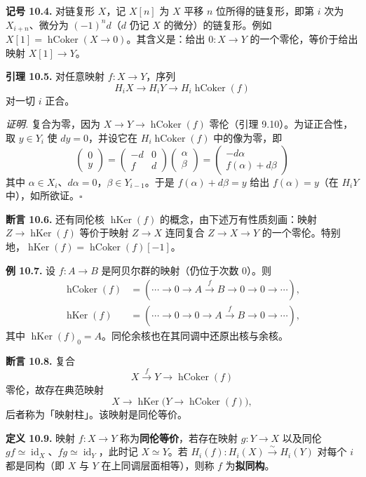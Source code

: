 \textbf{记号 10.4.} 对链复形 $X$，记 $X[n]$ 为 $X$ 平移 $n$ 位所得的链复形，即第 $i$ 次为 $X_{i+n}$、微分为 $(-1)^nd$（$d$ 仍记 $X$ 的微分）的链复形。例如 $X[1]=\operatorname{hCoker}(X\to0)$。其含义是：给出 $0\colon X\to Y$ 的一个零伦，等价于给出映射 $X[1]\to Y$。

\textbf{引理 10.5.} 对任意映射 $f\colon X\to Y$，序列
\[
H_iX\to H_iY\to H_i\operatorname{hCoker}(f)
\]
对一切 $i$ 正合。

\textit{证明.} 复合为零，因为 $X\to Y\to\operatorname{hCoker}(f)$ 零伦（引理 9.10）。为证正合性，取 $y\in Y_i$ 使 $dy=0$，并设它在 $H_i\operatorname{hCoker}(f)$ 中的像为零，即
\[
\begin{pmatrix}0\\ y\end{pmatrix}
=\begin{pmatrix}-d&0\\ f&d\end{pmatrix}\begin{pmatrix}\alpha\\ \beta\end{pmatrix}
=\begin{pmatrix}-d\alpha\\ f(\alpha)+d\beta\end{pmatrix}
\]
其中 $\alpha\in X_i$、$d\alpha=0$，$\beta\in Y_{i-1}$。于是 $f(\alpha)+d\beta=y$ 给出 $f(\alpha)=y$（在 $H_iY$ 中），如所欲证。\hfill$\square$

\textbf{断言 10.6.} 还有同伦核 $\operatorname{hKer}(f)$ 的概念，由下述万有性质刻画：映射 $Z\to\operatorname{hKer}(f)$ 等价于映射 $Z\to X$ 连同复合 $Z\to X\to Y$ 的一个零伦。特别地，$\operatorname{hKer}(f)=\operatorname{hCoker}(f)[-1]$。

\textbf{例 10.7.} 设 $f\colon A\to B$ 是阿贝尔群的映射（仍位于次数 $0$）。则
\[
\begin{aligned}
\operatorname{hCoker}(f)&=(\cdots\to0\to A\xrightarrow{\ f\ }B\to0\to0\to\cdots),\\
\operatorname{hKer}(f)&=(\cdots\to0\to0\to A\xrightarrow{\ f\ }B\to0\to\cdots),
\end{aligned}
\]
其中 $\operatorname{hKer}(f)_0=A$。同伦余核也在其同调中还原出核与余核。

\textbf{断言 10.8.} 复合
\[
X\xrightarrow{\ f\ }Y\to\operatorname{hCoker}(f)
\]
零伦，故存在典范映射
\[
X\to\operatorname{hKer}\bigl(Y\to\operatorname{hCoker}(f)\bigr),
\]
后者称为「映射柱」。该映射是同伦等价。

\textbf{定义 10.9.} 映射 $f\colon X\to Y$ 称为\textbf{同伦等价}，若存在映射 $g\colon Y\to X$ 以及同伦 $gf\simeq\operatorname{id}_X$、$fg\simeq\operatorname{id}_Y$，此时记 $X\simeq Y$。若 $H_i(f)\colon H_i(X)\xrightarrow{\sim}H_i(Y)$ 对每个 $i$ 都是同构（即 $X$ 与 $Y$ 在上同调层面相等），则称 $f$ 为\textbf{拟同构}。

